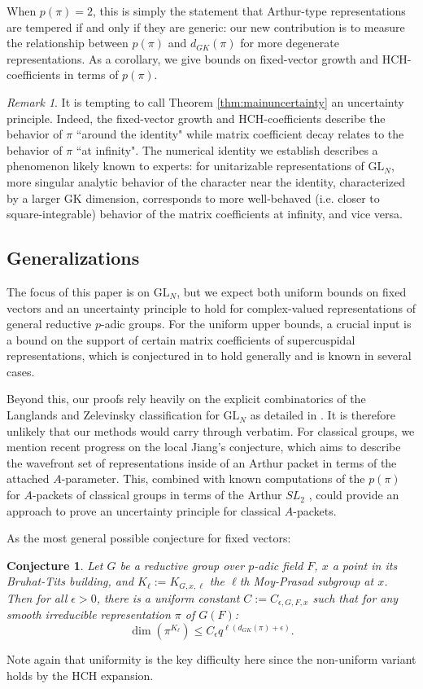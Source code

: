\documentclass{amsart}
\newcommand{\GL}{\mathrm{GL}}
\newcommand{\eps}{\epsilon}
\newcommand{\1}{\m 1}
\newtheorem{conj}[thm]{Conjecture}
\theoremstyle{remark}
\newtheorem{rmk}[thm]{Remark}
\theoremstyle{definition}
\numberwithin{equation}{subsection}
\begin{document}
When $p(\pi)=2$, this is simply the statement that Arthur-type representations are tempered if and only if they are generic: our new contribution is to measure the relationship between $p(\pi)$ and $d_{GK}(\pi)$ for more degenerate representations. As a corollary, we give bounds on fixed-vector growth and HCH-coefficients in terms of $p(\pi)$. 


\begin{rmk}

It is tempting to call Theorem \ref{thm:mainuncertainty} an uncertainty principle.  Indeed, the fixed-vector growth and HCH-coefficients describe the behavior of $\pi$ ``around the identity" while matrix coefficient decay relates to the behavior of $\pi$ ``at infinity". The numerical identity we establish describes a phenomenon likely known to experts: for unitarizable representations of $\GL_N$, more singular analytic behavior of the character near the identity, characterized by a larger GK dimension, corresponds to more well-behaved (i.e. closer to square-integrable) behavior of the matrix coefficients at infinity, and vice versa.
\end{rmk}

\subsection{Generalizations}
The focus of this paper is on $\GL_N$, but we expect both uniform bounds on fixed vectors and an uncertainty principle to hold for complex-valued representations of general reductive $p$-adic groups. For the uniform upper bounds, a crucial input is a bound on the support of certain matrix coefficients of supercuspidal representations, which is conjectured in \cite[\S 4]{FLM11} to hold generally and is known in several cases.

Beyond this, our proofs rely heavily on the explicit combinatorics of the Langlands and Zelevinsky classification for $\GL_N$ as detailed in \cite{LM14, LM16}. It is therefore unlikely that our methods would carry through verbatim. For classical groups, we mention recent progress on the local Jiang's conjecture, which aims to describe the wavefront set of representations inside of an Arthur packet \cite{LS25} in terms of the attached $A$-parameter. This, combined with known computations of the $p(\pi)$ for $A$-packets of classical groups in terms of the Arthur $SL_2$ \cite{DEP, EGGG}, could provide an approach to prove an uncertainty principle for classical $A$-packets.

As the most general possible conjecture for fixed vectors:
\begin{conj}
Let $G$ be a reductive group over $p$-adic field $F$, $x$ a point in its Bruhat-Tits building, and $K_\ell := K_{G, x, \ell}$ the $\ell$th Moy-Prasad subgroup at $x$. Then for all $\eps > 0$, there is a uniform constant $C := C_{\eps, G, F, x}$ such that for any smooth irreducible representation $\pi$ of $G(F)$:
\[
\dim(\pi^{K_\ell}) \leq C_\eps q^{\ell (d_{GK}(\pi) + \eps) }.
\]
\end{conj}
Note again that uniformity is the key difficulty here since the non-uniform variant holds by the HCH expansion. 
\end{document}
